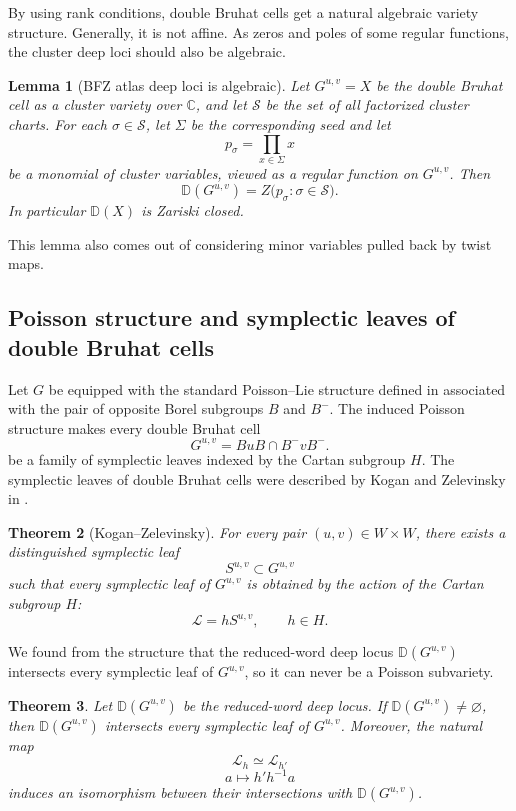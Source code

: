 \documentclass[12pt]{amsart}
\newcommand{\C}{\mathbb C}
\newcommand{\D}{\mathbb D}
\newcommand{\cS}{\mathcal S}
\theoremstyle{plain}
\newtheorem{theorem}{Theorem}[section]
\newtheorem{lemma}[theorem]{Lemma}
\theoremstyle{definition}
\theoremstyle{remark}
\begin{document}
By using rank conditions, double Bruhat cells get a natural algebraic variety structure. Generally, it is not affine. As zeros and poles of some regular functions, the cluster deep loci should also be algebraic.

\begin{lemma}[BFZ atlas deep loci is algebraic]
Let $G^{u,v}=X$ be the double Bruhat cell as a cluster variety over $\C$, and let $\cS$ be the set of all factorized cluster charts. For each $\sigma \in \cS$, let $\Sigma$ be the corresponding seed and let
\[
   p_\sigma=\prod_{x\in \Sigma}x
\]
be a monomial of cluster variables, viewed as a regular function on $G^{u,v}$.  Then
\[
   \D(G^{u,v})=Z\bigl(p_\sigma:\sigma\in\cS\bigr).
\]
In particular $\D(X)$ is Zariski closed.
\end{lemma}

This lemma also comes out of considering minor variables pulled back by twist maps.
\bigskip

\subsection{Poisson structure and symplectic leaves of double Bruhat cells}

Let $G$ be equipped with the standard Poisson--Lie structure defined in \cite{STS83} associated with the pair of opposite Borel subgroups $B$ and $B^-$. The induced Poisson structure makes every double Bruhat cell
\[
G^{u,v}=B uB\cap B^- vB^- .
\]
be a family of symplectic leaves indexed by the Cartan subgroup $H$. The symplectic leaves of double Bruhat cells were described by Kogan and Zelevinsky in \cite{KZ02}.

\begin{theorem}[Kogan--Zelevinsky]
For every pair $(u,v)\in W\times W$, there exists a distinguished
symplectic leaf
\[
S^{u,v}\subset G^{u,v}
\]
such that every symplectic leaf of $G^{u,v}$ is obtained by the
action of the Cartan subgroup $H$:
\[
\mathcal L=h S^{u,v},
\qquad h\in H .
\]
\end{theorem}

We found from the structure that the reduced-word deep locus $\D(G^{u,v})$ intersects every symplectic leaf of $G^{u,v}$, so it can never be a Poisson subvariety.

\begin{theorem}
Let $\D(G^{u,v})$ be the reduced-word deep locus. If $\D(G^{u,v})\neq\varnothing$, then $\D(G^{u,v})$ intersects every symplectic leaf of $G^{u,v}$.  Moreover, the natural map
\[\mathcal L_h\simeq \mathcal L_{h'}\]
\[a\mapsto h'h^{-1}a\]
induces an isomorphism between their intersections with $\D(G^{u,v})$.
\end{theorem}
\end{document}
